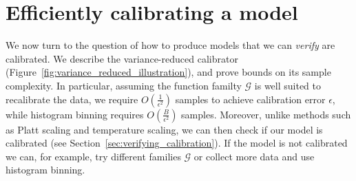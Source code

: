

\section{Efficiently calibrating a model}

We now turn to the question of how to produce models that we can \emph{verify} are calibrated.
We describe the variance-reduced calibrator (Figure~\ref{fig:variance_reduced_illustration}), and prove bounds on its sample complexity.
In particular, assuming the function familty $\mathcal{G}$ is well suited to recalibrate the data, we require $O(\frac{1}{\epsilon^2})$ samples to achieve calibration error $\epsilon$, while histogram binning requires $O(\frac{B}{\epsilon^2})$ samples.
Moreover, unlike methods such as Platt scaling and temperature scaling, we can then check if our model is calibrated (see Section~\ref{sec:verifying_calibration}).
If the model is not calibrated we can, for example, try different families $\mathcal{G}$ or collect more data and use histogram binning.




